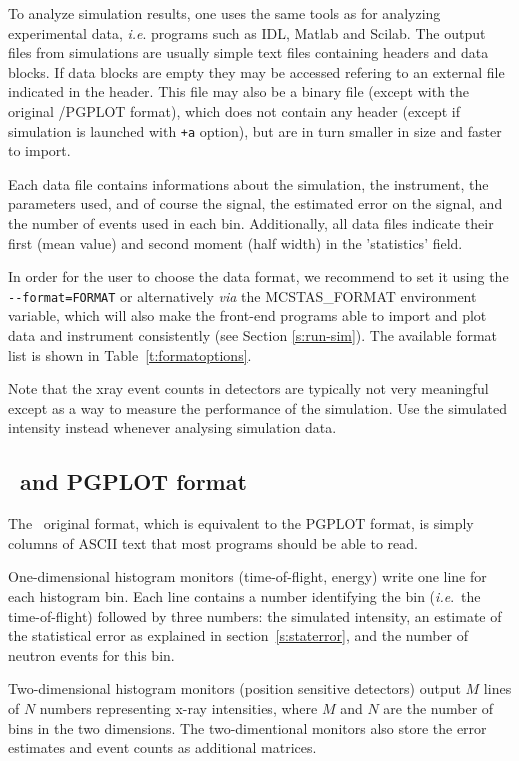 To analyze simulation results, one uses the same tools as for analyzing
experimental data, \textit{i.e}. programs such as IDL, Matlab and Scilab.
The output files from simulations are usually simple text files containing headers and data blocks. If data blocks are empty they may be accessed refering to an external file indicated in the header. This file may also be a binary file (except with the original \MCX /PGPLOT format), which does not contain any header (except if simulation is launched with \verb|+a| option), but are in turn smaller in size and faster to import.

Each data file contains informations about the simulation, the instrument, the parameters used, and of course the signal, the estimated error on the signal, and the number of events used in each bin. Additionally, all data files indicate their first (mean value) and second moment (half width) in the 'statistics' field.

In order for the user to choose the data format, we recommend to set it using the \verb+--format=FORMAT+ or alternatively \textit{via} the MCSTAS\_FORMAT environment variable, which will also make the front-end programs able to import and plot data and instrument consistently (see Section \ref{s:run-sim}). The available format list is shown in Table~\ref{t:formatoptions}. 

Note that the xray event counts in detectors are typically not very
meaningful except as a way to measure the performance of the
simulation. Use the simulated intensity instead whenever analysing
simulation data.

\subsection{\MCX\ and PGPLOT format}
 
The \MCX\ original format, which is equivalent to the PGPLOT format, is simply columns of ASCII text that most programs should
be able to read.

One-dimensional histogram monitors (time-of-flight, energy)
write one line for each histogram bin. Each line contains a number
identifying the bin (\textit{i.e}.\ the time-of-flight) followed by
three numbers: the simulated intensity, an estimate of the statistical
error as explained in section~\ref{s:staterror}, and the number of
neutron events for this bin.

Two-dimensional histogram monitors (position sensitive detectors)
output $M$ lines of $N$ numbers representing x-ray intensities, where
$M$ and $N$ are the number of bins in the two dimensions. The
two-dimentional monitors also store the error estimates and event counts as additional matrices.

